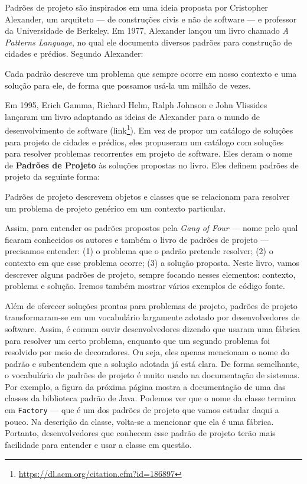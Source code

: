 \documentclass[
  11pt,
  twoside]{book}
\newcommand{\passthrough}[1]{#1}
\DeclareRobustCommand{\href}[2]{#2\footnote{\url{#1}}}
\renewenvironment{quote}{\centering \vspace{1.5ex} \begin{tcolorbox}[colback=backcolor, width=4.9in]}{\end{tcolorbox}}
\begin{document}
Padrões de projeto são inspirados em uma ideia proposta por Cristopher
Alexander, um arquiteto --- de construções civis e não de software --- e
professor da Universidade de Berkeley. Em 1977, Alexander lançou um
livro chamado \emph{A Patterns Language}, no qual ele documenta diversos
padrões para construção de cidades e prédios. Segundo Alexander:

\begin{quote}
Cada padrão descreve um problema que sempre ocorre em nosso contexto e
uma solução para ele, de forma que possamos usá-la um milhão de vezes.
\end{quote}

  

Em 1995, Erich Gamma, Richard Helm, Ralph Johnson e John Vlissides
lançaram um livro adaptando as ideias de Alexander para o mundo de
desenvolvimento de software
(\href{https://dl.acm.org/citation.cfm?id=186897}{link}). Em vez de
propor um catálogo de soluções para projeto de cidades e prédios, eles
propuseram um catálogo com soluções para resolver problemas recorrentes
em projeto de software. Eles deram o nome de \textbf{Padrões de Projeto}
às soluções propostas no livro. Eles definem padrões de projeto da
seguinte forma:

\begin{quote}
Padrões de projeto descrevem objetos e classes que se relacionam para
resolver um problema de projeto genérico em um contexto particular.
\end{quote}

 Assim, para entender os padrões propostos pela
\emph{Gang of Four} --- nome pelo qual ficaram conhecidos os autores e
também o livro de padrões de projeto --- precisamos entender: (1) o
problema que o padrão pretende resolver; (2) o contexto em que esse
problema ocorre; (3) a solução proposta. Neste livro, vamos descrever
alguns padrões de projeto, sempre focando nesses elementos: contexto,
problema e solução. Iremos também mostrar vários exemplos de código
fonte.

Além de oferecer soluções prontas para problemas de projeto, padrões de
projeto transformaram-se em um vocabulário largamente adotado por
desenvolvedores de software. Assim, é comum ouvir desenvolvedores
dizendo que usaram uma fábrica para resolver um certo problema, enquanto
que um segundo problema foi resolvido por meio de decoradores. Ou seja,
eles apenas mencionam o nome do padrão e subentendem que a solução
adotada já está clara. De forma semelhante, o vocabulário de padrões de
projeto é muito usado na documentação de sistemas. Por exemplo, a figura
da próxima página mostra a documentação de uma das classes da biblioteca
padrão de Java. Podemos ver que o nome da classe termina em
\passthrough{\lstinline!Factory!} --- que é um dos padrões de projeto
que vamos estudar daqui a pouco. Na descrição da classe, volta-se a
mencionar que ela é uma fábrica. Portanto, desenvolvedores que conhecem
esse padrão de projeto terão mais facilidade para entender e usar a
classe em questão.
\end{document}
